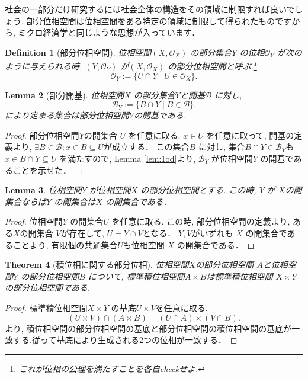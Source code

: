 \documentclass[lualatex]{ltjsbook}
\newtheorem{theorem}{Theorem}[chapter]
\newtheorem{lemma}[theorem]{Lemma}
\newtheorem{definition}[theorem]{Definition}
\theoremstyle{remark}
\theoremstyle{plain}
\begin{document}
社会の一部分だけ研究するには社会全体の構造をその領域に制限すれば良いでしょう. 部分位相空間は位相空間をある特定の領域に制限して得られたものですから,  ミクロ経済学と同じような思想が入っています．

\begin{definition}[部分位相空間]
	位相空間$\left( X, \mathcal{O}_X \right) $ の部分集合$Y$ の位相$\mathcal{O}_Y$ が次のように与えられる時,  $(Y, \mathcal{O}_Y)$ が$\left( X,  \mathcal{O}_X \right) $ の部分位相空間と呼ぶ.\footnote{これが位相の公理を満たすことを各自checkせよ.}
	\[
	\mathcal{O}_Y := \{U \cap Y  \mid U \in \mathcal{O}_X\}
	.\] 

\end{definition}

\begin{lemma}[部分開基]
	位相空間$X$ の部分集合$Y$と開基$\mathcal{B}$ に対し,  
	\[
	\mathcal{B}_Y := \{B\cap Y \mid B \in \mathcal{B}\} 
	.\]
	により定まる集合は部分位相空間$Y$の開基である.
\end{lemma}

\begin{proof}
	部分位相空間$Y$の開集合 $U$ を任意に取る.
	$x \in U$ を任意に取って,  開基の定義より,  $\exists B \in \mathcal{B}; x \in B \subseteq U$が成立する．
	この集合$B$ に対し,  集合$B \cap Y \in \mathcal{B}_Y$も $x \in B \cap Y  \subseteq U$ を満たすので,   Lemma \ref{lem:1od}より,  $\mathcal{B}_Y$ が位相空間$Y$ の開基であることを示せた．
\end{proof}

\begin{lemma}
\label{lem:openset}
	位相空間$Y$ が位相空間$X$ の部分位相空間とする.
	この時,  $Y$ が $X$の開集合ならば$Y$ の開集合は$X$ の開集合である．
\end{lemma}

\begin{proof}
	位相空間$Y$ の開集合$U$ を任意に取る.
	この時,  部分位相空間の定義より,  ある$X$の開集合 $V$が存在して,   $U=Y\cap V$となる．
	$Y, V$がいずれも $X$ の開集合であることより,  有限個の共通集合$U$も位相空間 $X$ の開集合である．
\end{proof}

\begin{theorem}[積位相に関する部分位相]
	位相空間$X$の部分位相空間 $A$と位相空間$Y$ の部分位相空間$B$ について,  標準積位相空間$A\times B$は標準積位相空間 $X \times Y$の部分位相空間である.
\end{theorem}

\begin{proof}
	標準積位相空間$X \times Y$ の基底$U\times V$を任意に取る.
	 \[
		 \left(U \times V\right) \cap \left( A \times B \right) = \left( U \cap A  \right) \times \left( V \cap B \right) 
	.\]
	より,  積位相空間の部分位相空間の基底と部分位相空間の積位相空間の基底が一致する.従って基底により生成される2つの位相が一致する．
\end{proof}
\end{document}
